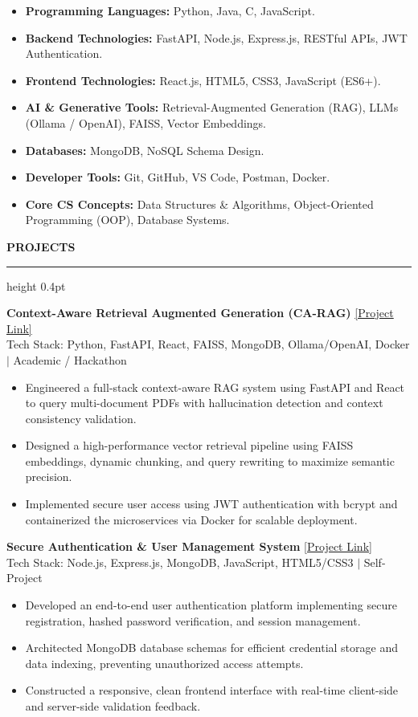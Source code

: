 \documentclass[a4paper,10pt]{article}
\newcommand{\resumesection}[1]{
    \vspace{5pt}
    {\large \bfseries \color{navy} \MakeUppercase{#1}}
    \vspace{1.5pt}
    \hrule height 0.4pt
    \vspace{3.5pt}
}
\begin{document}
\begin{itemize}
    \item \textbf{Programming Languages:} Python, Java, C, JavaScript.
    \item \textbf{Backend Technologies:} FastAPI, Node.js, Express.js, RESTful APIs, JWT Authentication.
    \item \textbf{Frontend Technologies:} React.js, HTML5, CSS3, JavaScript (ES6+).
    \item \textbf{AI \& Generative Tools:} Retrieval-Augmented Generation (RAG), LLMs (Ollama / OpenAI), FAISS, Vector Embeddings.
    \item \textbf{Databases:} MongoDB, NoSQL Schema Design.
    \item \textbf{Developer Tools:} Git, GitHub, VS Code, Postman, Docker.
    \item \textbf{Core CS Concepts:} Data Structures \& Algorithms, Object-Oriented Programming (OOP), Database Systems.
\end{itemize}

\resumesection{Projects}

\noindent
\textbf{\large Context-Aware Retrieval Augmented Generation (CA-RAG)} \hfill \href{https://github.com/Vamsi-Krishna-21/CA-RAG}{[Project Link]} \\
\footnotesize \textcolor{gray!80!black}{Tech Stack: Python, FastAPI, React, FAISS, MongoDB, Ollama/OpenAI, Docker $|$ Academic / Hackathon}
\begin{itemize}
    \item Engineered a full-stack context-aware RAG system using FastAPI and React to query multi-document PDFs with hallucination detection and context consistency validation.
    \item Designed a high-performance vector retrieval pipeline using FAISS embeddings, dynamic chunking, and query rewriting to maximize semantic precision.
    \item Implemented secure user access using JWT authentication with bcrypt and containerized the microservices via Docker for scalable deployment.
\end{itemize}

\vspace{1pt}
\noindent
\textbf{\large Secure Authentication \& User Management System} \hfill \href{https://github.com/Vamsi-Krishna-21}{[Project Link]} \\
\footnotesize \textcolor{gray!80!black}{Tech Stack: Node.js, Express.js, MongoDB, JavaScript, HTML5/CSS3 $|$ Self-Project}
\begin{itemize}
    \item Developed an end-to-end user authentication platform implementing secure registration, hashed password verification, and session management.
    \item Architected MongoDB database schemas for efficient credential storage and data indexing, preventing unauthorized access attempts.
    \item Constructed a responsive, clean frontend interface with real-time client-side and server-side validation feedback.
\end{itemize}
\end{document}
